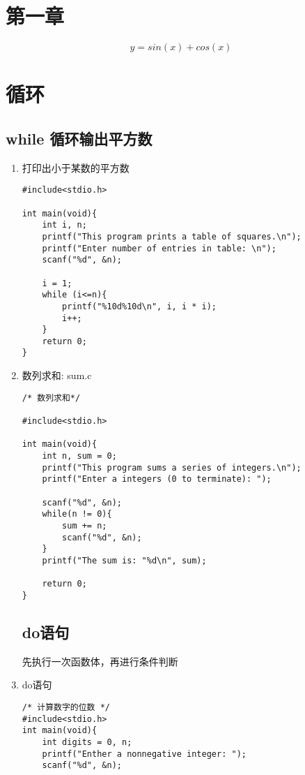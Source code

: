 \documentclass{article}
\author{\kaishu }
\date{\today}
\begin{document}
\section{第一章}


    \[y=sin(x) + cos(x)\]
    
\section{循环}
    \subsection*{while 循环输出平方数}
        \begin{enumerate}
            \item 打印出小于某数的平方数
                \begin{lstlisting}
#include<stdio.h>

int main(void){
    int i, n;
    printf("This program prints a table of squares.\n");
    printf("Enter number of entries in table: \n");
    scanf("%d", &n);

    i = 1;
    while (i<=n){
        printf("%10d%10d\n", i, i * i);
        i++;
    }
    return 0;
}
                \end{lstlisting}

            \item 数列求和: sum.c
                \begin{lstlisting}
/* 数列求和*/

#include<stdio.h>

int main(void){
    int n, sum = 0;
    printf("This program sums a series of integers.\n");
    printf("Enter a integers (0 to terminate): ");

    scanf("%d", &n);
    while(n != 0){
        sum += n;
        scanf("%d", &n);
    }
    printf("The sum is: "%d\n", sum);

    return 0;
}
                \end{lstlisting}

            \subsection*{do语句}
            先执行一次函数体，再进行条件判断
                \item do语句
                \begin{lstlisting}
/* 计算数字的位数 */
#include<stdio.h>
int main(void){
    int digits = 0, n;
    printf("Enther a nonnegative integer: ");
    scanf("%d", &n);


\end{lstlisting}
\end{enumerate}
\end{document}

